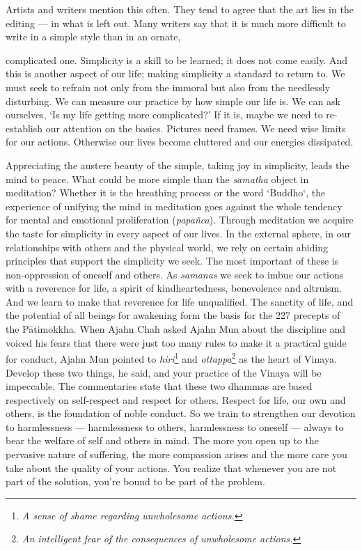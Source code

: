 Artists and writers mention this often. They tend to agree that the art
lies in the editing --- in what is left out. Many writers say that it is
much more difficult to write in a simple style than in an ornate,

complicated one. Simplicity is a skill to be learned; it does not come
easily. And this is another aspect of our life; making simplicity a
standard to return to. We must seek to refrain not only from the immoral
but also from the needlessly disturbing. We can measure our practice by
how simple our life is. We can ask ourselves, `Is my life getting more
complicated?' If it is, maybe we need to re-establish our attention on
the basics. Pictures need frames. We need wise limits for our actions.
Otherwise our lives become cluttered and our energies dissipated.

Appreciating the austere beauty of the simple, taking joy in simplicity,
leads the mind to peace. What could be more simple than the
\emph{samatha} object in meditation? Whether it is the breathing process
or the word `Buddho`, the experience of unifying the mind in meditation
goes against the whole tendency for mental and emotional proliferation
(\emph{papañca}). Through meditation we acquire the taste for simplicity
in every aspect of our lives. In the external sphere, in our
relationships with others and the physical world, we rely on certain
abiding principles that support the simplicity we seek. The most
important of these is non-oppression of oneself and others. As
\emph{samanas} we seek to imbue our actions with a reverence for life, a
spirit of kindheartedness, benevolence and altruism. And we learn to
make that reverence for life unqualified. The sanctity of life, and the
potential of all beings for awakening form the basis for the 227
precepts of the Pātimokkha. When Ajahn Chah asked Ajahn Mun about the
discipline and voiced his fears that there were just too many rules to
make it a practical guide for conduct, Ajahn Mun pointed to
\emph{hiri}\footnote{\emph{A sense of shame regarding unwholesome
  actions.}} and \emph{ottappa}\footnote{\emph{An intelligent fear of
  the consequences of unwholesome actions.}} as the heart of Vinaya.
Develop these two things, he said, and your practice of the Vinaya will
be impeccable. The commentaries state that these two dhammas are based
respectively on self-respect and respect for others. Respect for life,
our own and others, is the foundation of noble conduct. So we train to
strengthen our devotion to harmlessness --- harmlessness to others,
harmlessness to oneself --- always to bear the welfare of self and
others in mind. The more you open up to the pervasive nature of
suffering, the more compassion arises and the more care you take about
the quality of your actions. You realize that whenever you are not part
of the solution, you're bound to be part of the problem.

